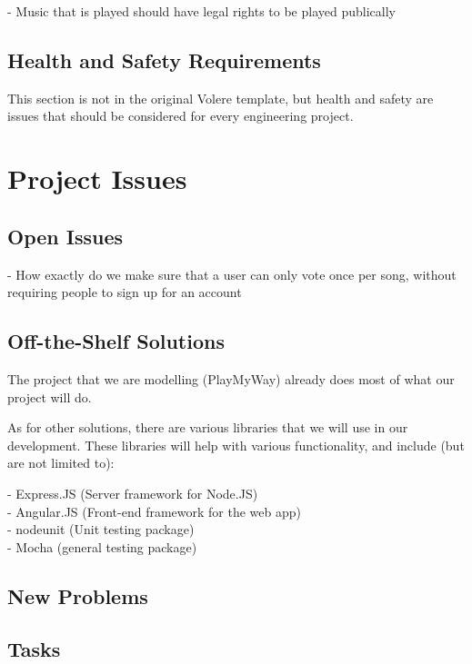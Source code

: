 \documentclass[12pt, titlepage]{article}
\begin{document}
- Music that is played should have legal rights to be played publically \\

\subsection{Health and Safety Requirements}

This section is not in the original Volere template, but health and safety are
issues that should be considered for every engineering project.

\section{Project Issues}

\subsection{Open Issues}

- How exactly do we make sure that a user can only vote once per song, without
  requiring people to sign up for an account \\

\subsection{Off-the-Shelf Solutions}

The project that we are modelling (PlayMyWay) already does most of what our
project will do.

As for other solutions, there are various libraries that we will use in our
development. These libraries will help with various functionality, and include
(but are not limited to):

- Express.JS (Server framework for Node.JS) \\
- Angular.JS (Front-end framework for the web app) \\
- nodeunit (Unit testing package) \\
- Mocha (general testing package) \\

\subsection{New Problems}

\subsection{Tasks}
\end{document}
